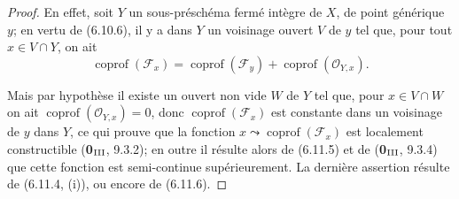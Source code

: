 \begin{proof}
En effet, soit $Y$ un sous-préschéma fermé intègre de $X$, de point
générique $y$; en vertu de (6.10.6), il y a dans $Y$ un voisinage ouvert
$V$ de $y$ tel que, pour tout $x\in V\cap Y$, on ait
\begin{equation}
\operatorname{coprof}(\mathcal F_x)=
\operatorname{coprof}(\mathcal F_y)+
\operatorname{coprof}(\mathcal O_{Y,x}).
\tag{6.11.8.1}\label{IV.2.s6.11.8.1-fr}
\end{equation}

Mais par hypothèse il existe un ouvert non vide $W$ de $Y$ tel que, pour
$x\in V\cap W$ on ait $\operatorname{coprof}(\mathcal O_{Y,x})=0$, donc
$\operatorname{coprof}(\mathcal F_x)$ est constante dans un voisinage de
$y$ dans $Y$, ce qui prouve que la fonction
$x\leadsto\operatorname{coprof}(\mathcal F_x)$ est localement constructible
(\textbf{0}$_{\rm III}$, 9.3.2); en outre il résulte alors de (6.11.5) et de
(\textbf{0}$_{\rm III}$, 9.3.4) que cette fonction est semi-continue supérieurement.
La dernière assertion résulte de (6.11.4, (i)), ou encore de (6.11.6).
\end{proof}


